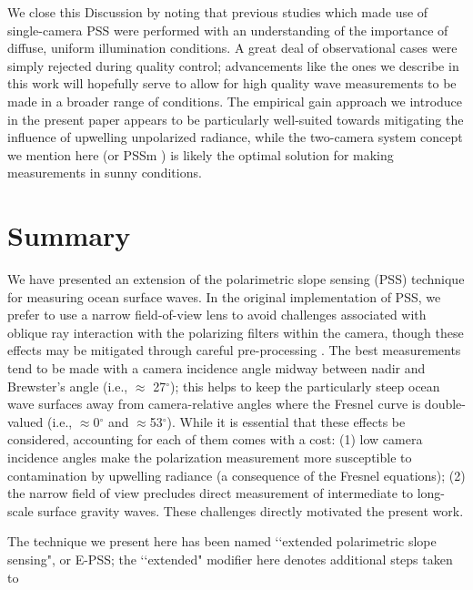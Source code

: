 \documentclass[letterpaper,journal]{IEEEtran}
\begin{document}
We close this Discussion by noting that previous studies which made use of single-camera PSS \cite{Zappa2012,Laxague2015,Laxague2018b} were performed with an understanding of the importance of diffuse, uniform illumination conditions. A great deal of observational cases were simply rejected during quality control; advancements like the ones we describe in this work will hopefully serve to allow for high quality wave measurements to be made in a broader range of conditions. The empirical gain approach we introduce in the present paper appears to be particularly well-suited towards mitigating the influence of upwelling unpolarized radiance, while the two-camera system concept we mention here (or PSSm \cite{malinowski_surface_2024}) is likely the optimal solution for making measurements in sunny conditions.



\section{Summary}
\label{sec:summary}

We have presented an extension of the polarimetric slope sensing (PSS) technique for measuring ocean surface waves. In the original implementation of PSS, we prefer to use a narrow field-of-view lens to avoid challenges associated with oblique ray interaction with the polarizing filters within the camera, though these effects may be mitigated through careful pre-processing \cite{pistellato_geometric_2024}. The best measurements tend to be made with a camera incidence angle midway between nadir and Brewster's angle (i.e., $\approx$ 27$^{\circ}$); this helps to keep the particularly steep ocean wave surfaces away from camera-relative angles where the Fresnel curve is double-valued (i.e., $\approx$0$^{\circ}$ and $\approx$53$^{\circ}$). While it is essential that these effects be considered, accounting for each of them comes with a cost: (1) low camera incidence angles make the polarization measurement more susceptible to contamination by upwelling radiance (a consequence of the Fresnel equations); (2) the narrow field of view precludes direct measurement of intermediate to long-scale surface gravity waves. These challenges directly motivated the present work.


The technique we present here has been named \lq\lq extended polarimetric slope sensing", or E-PSS; the \lq\lq extended" modifier here denotes additional steps taken to 
\end{document}
